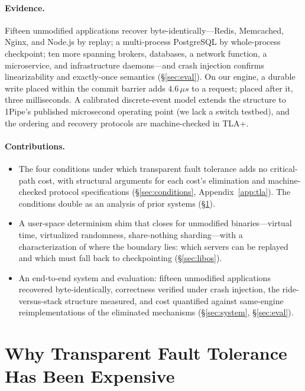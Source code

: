 \paragraph{Evidence.} Fifteen unmodified applications recover
byte-identically---Redis, Memcached, Nginx, and Node.js by replay; a
multi-process PostgreSQL by whole-process checkpoint; ten more spanning
brokers, databases, a network function, a microservice, and
infrastructure daemons---and crash injection confirms linearizability and
exactly-once semantics (\S\ref{sec:eval}). On our engine, a durable write
placed within the commit barrier adds $4.6\,\mu s$ to a request; placed
after it, three milliseconds. A calibrated discrete-event model extends
the structure to 1Pipe's published microsecond operating point (we lack a
switch testbed), and the ordering and recovery protocols are
machine-checked in TLA+.

\paragraph{Contributions.}
\begin{itemize}[leftmargin=1.4em,itemsep=1pt,topsep=2pt]
\item The four conditions under which transparent fault tolerance adds no
  critical-path cost, with structural arguments for each cost's
  elimination and machine-checked protocol specifications
  (\S\ref{sec:conditions}, Appendix~\ref{app:tla}). The conditions double
  as an analysis of prior systems (\S\ref{sec:why}).
\item A user-space determinism shim that closes \Determinism for
  unmodified binaries---virtual time, virtualized randomness, share-nothing
  sharding---with a characterization of where the boundary lies: which
  servers can be replayed and which must fall back to checkpointing
  (\S\ref{sec:libos}).
\item An end-to-end system and evaluation: fifteen unmodified applications
  recovered byte-identically, correctness verified under crash injection,
  the ride-versus-stack structure measured, and cost quantified against
  same-engine reimplementations of the eliminated mechanisms
  (\S\ref{sec:system}, \S\ref{sec:eval}).
\end{itemize}

\section{Why Transparent Fault Tolerance Has Been Expensive}
\label{sec:why}

